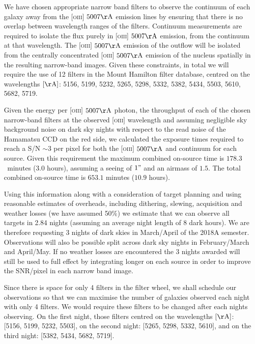 \documentclass[12pt]{article}
\begin{document}
We have chosen appropriate narrow band filters to observe the continuum of each galaxy away from the \textsc{[oiii]} $5007\rm{\AA}$ emission lines by ensuring that there is no overlap between wavelength ranges of the filters.  Continuum measurements are required to isolate the flux purely in \textsc{[oiii]} $5007\rm{\AA}$ emission, from the continuum at that wavelength. The \textsc{[oiii]} $5007\rm{\AA}$ emission of the outflow will be isolated from the centrally concentrated \textsc{[oiii]} $5007\rm{\AA}$ emission of the nucleus spatially in the resulting narrow-band images. Given these constraints, in total we will require the use of 12 filters in the Mount Hamilton filter database, centred on the wavelengths $[\rm{\AA}]$: 5156, 5199, 5232, 5265, 5298, 5332, 5382, 5434, 5503, 5610, 5682, 5719. 

\vspace{0.25em}

Given the energy per \textsc{[oiii]} $5007\rm{\AA}$ photon, the throughput of each of the chosen narrow-band filters at the observed \textsc{[oiii]} wavelength and assuming negligible sky background noise on dark sky nights with respect to the read noise of the Hamamatsu CCD on the red side, we calculated the exposure times required to reach a S/N $\sim 3$ per pixel for both the \textsc{[oiii]} $5007\rm{\AA}$ and continuum for each source. Given this requirement the maximum combined on-source time is $178.3$~minutes ($3.0$ hours), assuming a seeing of $1"$ and an airmass of $1.5$. The total combined on-source time is $653.1$ minutes ($10.9$ hours).  
\vspace{0.25em}

Using this information along with a consideration of target planning and using reasonable estimates of overheads, including dithering, slewing, acquisition and weather losses (we have assumed 50\%) we estimate that we can observe all targets in 2.84 nights (assuming an average night length of $8$ dark hours). We are therefore requesting 3 nights of dark skies in March/April of the 2018A semester. Observations will also be possible split across dark sky nights in February/March and April/May. If no weather losses are encountered the $3$ nights awarded will still be used to full effect by integrating longer on each source in order to improve the SNR/pixel in each narrow band image. 

Since there is space for only 4 filters in the filter wheel, we shall schedule our observations so that we can maximise the number of galaxies observed each night with only 4 filters. We would require these filters to be changed after each nights observing.  On the first night, those filters centred on the wavelengths $[\rm{\AA}]$: [5156, 5199, 5232, 5503], on the second night: [5265, 5298, 5332, 5610], and on the third night: [5382, 5434, 5682, 5719]. 
\end{document}
